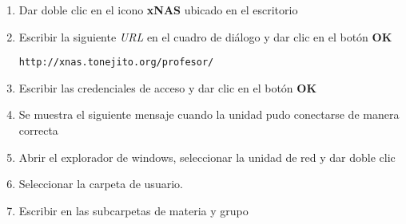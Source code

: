 {\begin{enumerate}
%

  \item Dar doble clic en el icono \textbf{xNAS} ubicado en el escritorio


  \item Escribir la siguiente \textit{URL} en el cuadro de di\'{a}logo y dar clic en el bot\'{o}n \textbf{OK}

    \texttt{http://xnas.tonejito.org/profesor/}


  \item Escribir las credenciales de acceso y dar clic en el bot\'{o}n \textbf{OK}


  \item Se muestra el siguiente mensaje cuando la unidad pudo conectarse de manera correcta


  \item Abrir el explorador de windows, seleccionar la unidad de red y dar doble clic


  \item Seleccionar la carpeta de usuario.


  \item Escribir en las subcarpetas de materia y grupo


\end{enumerate}
}

